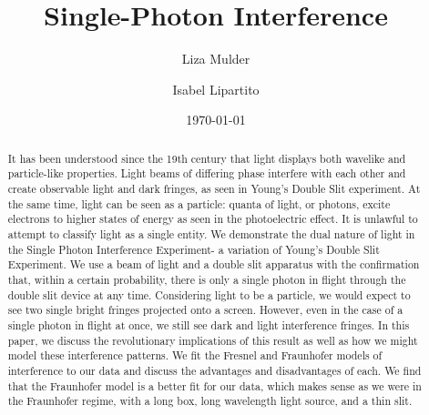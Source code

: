 \documentclass[prb,preprint]{revtex4-1}
\begin{document}

\title{Single-Photon Interference}


\author{Liza Mulder}


\author{Isabel Lipartito}


\date{\today}



\begin{abstract}

It has been understood since the 19th century that light displays both wavelike and particle-like properties.  Light beams of differing phase interfere with each other and create observable light and dark fringes, as seen in Young's Double Slit experiment.  At the same time, light can be seen as a particle:  quanta of light, or photons, excite electrons to higher states of energy as seen in the photoelectric effect.  It is unlawful to attempt to classify light as a single entity.  We demonstrate the dual nature of light in the Single Photon Interference Experiment- a variation of Young's Double Slit Experiment.  We use a beam of light and a double slit apparatus with the confirmation that, within a certain probability, there is only a single photon in flight through the double slit device at any time.  Considering light to be a particle, we would expect to see two single bright fringes projected onto a screen.  However, even in the case of a single photon in flight at once, we still see dark and light interference fringes.  In this paper, we discuss the revolutionary implications of this result as well as how we might model these interference patterns.  We fit the Fresnel and Fraunhofer models of interference to our data and discuss the advantages and disadvantages of each.  We find that the Fraunhofer model is a better fit for our data, which makes sense as we were in the Fraunhofer regime, with a long box, long wavelength light source, and a thin slit.

\end{abstract}

\maketitle %
\end{document}
